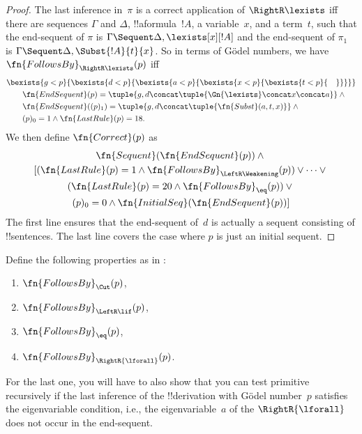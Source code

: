 \documentclass[../../../include/open-logic-section]{subfiles}
\begin{document}
\begin{proof}
The last inference in~$\pi$ is a correct application of
$\RightR\lexists$ iff there are sequences $\Gamma$ and $\Delta$,
!!a{formula}~$!A$, a variable~$x$, and a term~$t$, such that
the end-sequent of $\pi$ is $\Gamma \Sequent \Delta, \lexists[x][!A]$
and the end-sequent of $\pi_1$ is $\Gamma \Sequent \Delta,
\Subst{!A}{t}{x}$. So in terms of G\"odel numbers, we have
$\fn{FollowsBy}_{\RightR\lexists}(p)$
iff
\begin{align*}
  & \bexists{g<p}{\bexists{d<p}{\bexists{a<p}{\bexists{x<p}{\bexists{t<p}{\quad}}}}}\\
  & \qquad \fn{EndSequent}(p) = 
  \tuple{
    g,
    d \concat \tuple{\Gn{\lexists} \concat x \concat a}
  } \land {}\\
  & \qquad \fn{EndSequent}((p)_1) = 
  \tuple{
    g,
    d \concat \tuple{\fn{Subst}(a, t, x)}
  } \land {}\\
  & \qquad (p)_0 = 1 \land \fn{LastRule}(p) = 18.
\end{align*}
We then define $\fn{Correct}(p)$ as
\begin{multline*}
  \fn{Sequent}(\fn{EndSequent}(p)) \land {}\\ 
  [(\fn{LastRule}(p) = 1 \land 
  \fn{FollowsBy}_{\LeftR\Weakening}(p)) \lor \dots \lor {}\\
  (\fn{LastRule}(p) = 20 \land \fn{FollowsBy}_{\eq}(p)) \lor {}\\
  (p)_0 = 0 \land \fn{InitialSeq}(\fn{EndSequent}(p))]
\end{multline*}
The first line ensures that the end-sequent of~$d$ is actually a
sequent consisting of !!{sentence}s. The last line covers the case
where $p$ is just an initial sequent.
\end{proof}

\begin{prob}
  Define the following properties as in
  :
  \begin{enumerate}
  \item $\fn{FollowsBy}_{\Cut}(p)$,
  \item $\fn{FollowsBy}_{\LeftR\lif}(p)$,
  \item $\fn{FollowsBy}_{\eq}(p)$,
  \item $\fn{FollowsBy}_{\RightR{\lforall}}(p)$.
  \end{enumerate}
  For the last one, you will have to also show that you can test
  primitive recursively if the last inference of the
  !!{derivation} with G\"odel number~$p$ satisfies the eigenvariable
  condition, i.e., the eigenvariable~$a$ of the $\RightR{\lforall}$
  does not occur in the end-sequent.
  \end{prob}
  
\end{document}
